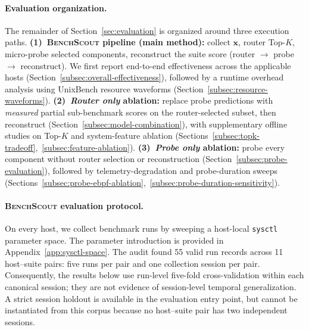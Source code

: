 \documentclass[sigplan,10pt]{acmart}
\newcommand{\ourmethod}{\textsc{BenchScout}\xspace}
\begin{document}

\paragraph{Evaluation organization.}
The remainder of Section~\ref{sec:evaluation} is organized around three execution paths.
\textbf{(1)~\ourmethod{} pipeline (main method):}
collect $\mathbf{x}$, router Top-$K$, micro-probe selected components, reconstruct the suite score (router $\rightarrow$ probe $\rightarrow$ reconstruct).
We first report end-to-end effectiveness across the applicable hosts (Section~\ref{subsec:overall-effectiveness}), followed by a runtime overhead analysis using UnixBench resource waveforms (Section~\ref{subsec:resource-waveforms}).
\textbf{(2)~\emph{Router only} ablation:}
replace probe predictions with \emph{measured} partial sub-benchmark scores on the router-selected subset, then reconstruct (Section~\ref{subsec:model-combination}), with supplementary offline studies on Top-$K$ and system-feature ablation (Sections~\ref{subsec:topk-tradeoff},~\ref{subsec:feature-ablation}).
\textbf{(3)~\emph{Probe only} ablation:}
probe every component without router selection or reconstruction (Section~\ref{subsec:probe-evaluation}), followed by telemetry-degradation and probe-duration sweeps (Sections~\ref{subsec:probe-ebpf-ablation},~\ref{subsec:probe-duration-sensitivity}).

\paragraph{\ourmethod{} evaluation protocol.}
On every host, we collect benchmark runs by sweeping a host-local \texttt{sysctl} parameter space.
The parameter introduction is provided in Appendix~\ref{app:sysctl-space}.
The audit found 55 valid run records across 11 host--suite pairs: five runs per pair
and one collection session per pair.  Consequently, the results below use run-level
five-fold cross-validation within each canonical session; they are not evidence of
session-level temporal generalization.  A strict session holdout is available in the
evaluation entry point, but cannot be instantiated from this corpus because no
host--suite pair has two independent sessions.
\end{document}
